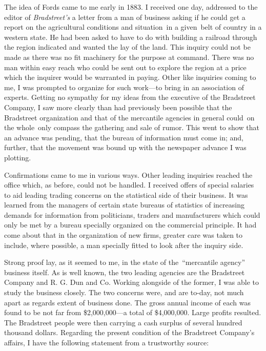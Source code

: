 \documentclass[openany,nobib]{tufte-book}
\begin{document}
The idea of Fords came to me early in 1883. I received one day,
addressed to the editor of \emph{Bradstreet's} a letter from a man of
business asking if he could get a report on the agricultural conditions
and situation~in a given~belt of country in a western state. He had been
asked to have to do with building a railroad through the region
indicated and wanted the lay of the land. This inquiry could not be made
as there was no fit machinery for the purpose at command. There was no
man within easy reach who could be sent out to explore the region at a
price which the inquirer would be warranted in paying. Other like
inquiries coming to me, I was prompted to organize for such work---to
bring in an association of experts. Getting no sympathy for my ideas
from the executive of the Bradstreet Company, I saw more clearly than
had previously been possible that the Bradstreet organization and that
of the mercantile agencies in general could~on the whole~only compass
the gathering and sale of rumor. This went to show that an advance was
pending, that the bureau of information must come in; and, further, that
the movement was bound up with the newspaper advance I was plotting.~

Confirmations came to me in various ways. Other leading inquiries
reached the office which, as before, could not be handled. I received
offers of special salaries to aid leading trading concerns on the
statistical side of their business. It was learned from the managers of
certain state bureaus of statistics of increasing demands for
information from politicians, traders and manufacturers which could only
be met by a bureau specially organized on the commercial principle. It
had come about that in the organization of new firms, greater care was
taken to include, where possible, a man specially fitted to look after
the inquiry side. ~

Strong proof lay, as it seemed to me, in the state of the~``mercantile
agency'' business itself. As is well known, the two leading agencies are
the Bradstreet Company and R. G. Dun and Co. Working alongside of the
former, I was able to study the business closely. The two concerns were,
and are to-day, not much apart as regards extent of business done. The
gross annual income of each was found to be not far from \$2,000,000---a
total of \$4,000,000. Large profits resulted. The Bradstreet people were
then carrying a cash surplus of several hundred thousand dollars.
Regarding the present condition of the Bradstreet Company's affairs, I
have the following statement from a trustworthy source:
\end{document}
